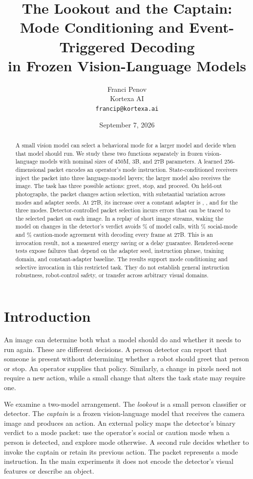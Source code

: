 \documentclass[10pt]{article}
\title{The Lookout and the Captain:\\
Mode Conditioning and Event-Triggered Decoding\\in Frozen Vision-Language Models}
\author{Franci Penov\\Kortexa AI\\\texttt{francip@kortexa.ai}}
\date{September 7, 2026}
\begin{document}
\maketitle
\begin{abstract}
A small vision model can select a behavioral mode for a larger model and
decide when that model should run. We study these two functions separately
in frozen vision-language models with nominal sizes of 450M, 3B, and 27B
parameters. A learned 256-dimensional packet encodes an operator's mode
instruction. State-conditioned receivers inject the packet into three
language-model layers; the larger model also receives the image. The task
has three possible actions: greet, stop, and proceed. On held-out photographs,
the packet changes action selection, with substantial variation across
modes and adapter seeds. At 27B, its increase over a constant adapter is
\SocialLean{}, \CautionLean{}, and \ExploreLean{} for the three modes.
Detector-controlled packet selection incurs errors that can be traced to
the selected packet on each image. In a replay of short image streams,
waking the model on changes in the detector's verdict avoids \AvoidedPct{}\%
of model calls, with \SocialAgreePct{}\% social-mode and
\CautionAgreePct{}\% caution-mode agreement with decoding every frame at
27B. This is an invocation result, not a measured energy saving or a delay
guarantee. Rendered-scene tests expose failures that depend on the adapter
seed, instruction phrase, training domain, and constant-adapter baseline.
The results support mode conditioning and selective invocation in this
restricted task. They do not establish general instruction robustness,
robot-control safety, or transfer across arbitrary visual domains.
\end{abstract}

\section{Introduction}
An image can determine both what a model should do and whether it needs
to run again. These are different decisions. A person detector can report
that someone is present without determining whether a robot should greet
that person or stop. An operator supplies that policy. Similarly, a change
in pixels need not require a new action, while a small change that alters
the task state may require one.

We examine a two-model arrangement. The \emph{lookout} is a small person
classifier or detector. The \emph{captain} is a frozen vision-language model
that receives the camera image and produces an action. An external policy
maps the detector's binary verdict to a mode packet: use the operator's
social or caution mode when a person is detected, and explore mode
otherwise. A second rule decides whether to invoke the captain or retain
its previous action. The packet represents a mode instruction. In the
main experiments it does not encode the detector's visual features or
describe an object.
\end{document}
